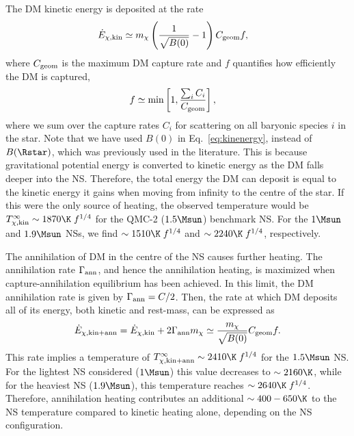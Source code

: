 The DM kinetic energy is deposited at the rate
\begin{align}
  \dot E_{\chi, \rm kin} & \simeq m_\chi \left( \frac{1}{\sqrt{B(0)}} - 1\right)C_{\rm geom}f, \label{eq:kinenergy}
\end{align}
where $C_{\rm geom}$ is the maximum DM capture rate and $f$ quantifies how efficiently the DM is captured, 
\begin{align}
  f & \simeq \min\left[ 1,  \frac{ \sum_i C_i}{C_{\rm geom}} \right],
\end{align}
where we sum over the capture rates $C_i$ for scattering on all baryonic species $i$ in the star. 
Note that we have used $B(0)$ in Eq.~\ref{eq:kinenergy}, instead of $B(\Rstar)$, which was previously used in the literature. This is because gravitational potential energy is converted to kinetic energy as the DM falls deeper into the NS. Therefore, the total energy the DM can deposit is equal to the kinetic energy it gains when moving from infinity to the centre of the star. 
If this were the only source of heating, the observed temperature would be  $T^\infty_{\chi,\rm kin}  \sim 1870\K\;f^{1/4}$ for the QMC-2 ($1.5\Msun$) benchmark NS. For the $1\Msun$ and $1.9\Msun$ NSs, we find 
$\sim 1510\K\; f^{1/4}$ and $\sim2240\K\; f^{1/4}$, respectively.


The annihilation of DM in the centre of the NS causes further heating. The annihilation rate $\Gamma_{\rm ann}$, and hence the annihilation heating, is maximized when capture-annihilation equilibrium has been achieved. In this limit, the DM annihilation rate is given by $\Gamma_{\rm ann} = C/2$. Then, the rate at which DM deposits all of its energy, both kinetic and rest-mass, can be expressed as 
\begin{equation}
  \dot E_{\chi, \rm kin + ann} = \dot E_{\chi, \rm kin} + 2 \Gamma_{\rm ann} m_\chi \simeq \frac{m_\chi}{\sqrt{B(0)}} C_{\rm geom}f. \label{eq:massheating}
\end{equation} 
This rate implies a temperature of $T^\infty_{\chi,\rm kin+ann}  \sim  2410\K\;f^{1/4}$ for the $1.5\Msun$ NS. For the lightest NS considered ($1\Msun$) this value decreases to $\sim  2160\K$, while for the heaviest NS ($1.9\Msun$), this temperature reaches $\sim  2640\K\;f^{1/4}$. Therefore, annihilation heating contributes an additional $\sim 400-650\K$ to the NS temperature compared to kinetic heating alone, depending on the NS configuration. 
  


